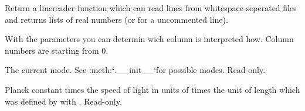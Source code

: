 \documentclass[letterpaper,10pt,english]{sphinxmanual}
\begin{document}
\begin{fulllineitems}
\begin{fulllineitems}
\begin{quote}
\begin{description}
\begin{itemize}
\end{itemize}


\end{description}\end{quote}

\end{fulllineitems}


\begin{fulllineitems}
\label{\detokenize{modules-api/experiment:Experiment.ReflDataSimulator.createLinereader}}
Return a linereader function which can read lines from whitespace-seperated files and returns lists of real numbers  (or  for a uncommented line).

With the parameters  you can determin wich column is interpreted how.
Column numbers are starting from 0.

\end{fulllineitems}


\begin{fulllineitems}
\label{\detokenize{modules-api/experiment:Experiment.ReflDataSimulator.mode}}
The current mode. See :meth:{\color{red}\bfseries{}{}`}.\_\_init\_\_{}`for possible modes. Read-only.

\end{fulllineitems}


\begin{fulllineitems}
\label{\detokenize{modules-api/experiment:Experiment.ReflDataSimulator.hcfactor}}
Planck constant times the speed of light in units of  times the unit of length which was defined by  with {\hyperref[\detokenize{modules-api/experiment:Experiment.ReflDataSimulator.__init__}]{}}. Read-only.

\end{fulllineitems}


\end{fulllineitems}
\end{document}
